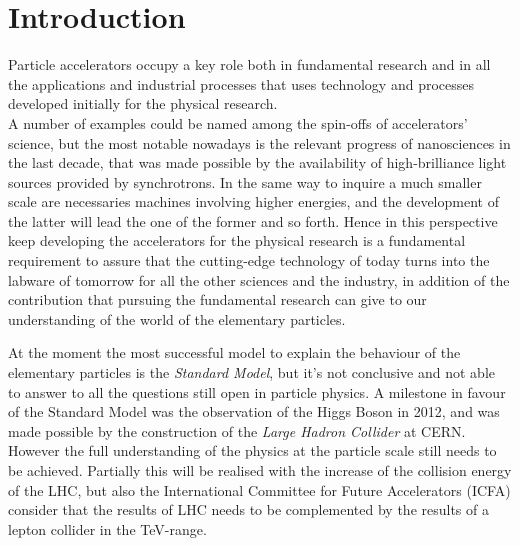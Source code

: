 \chapter{Introduction}
Particle accelerators occupy a key role both in fundamental research and in all the applications and industrial processes that uses technology and processes developed initially for the physical research.\\
A number of examples could be named among the spin-offs of accelerators' science, but the most notable nowadays is the relevant progress of nanosciences in the last decade, that was made possible by the availability of high-brilliance light sources provided by synchrotrons. In the same way to inquire a much smaller scale are necessaries machines involving higher energies, and the development of the latter will lead the one of the former and so forth.
 Hence in this perspective keep developing the accelerators for the physical research is a fundamental requirement to assure that the cutting-edge technology of today turns into the labware of tomorrow for all the other sciences and the industry, in addition of the contribution that pursuing the fundamental research can give to our understanding of the world of the elementary particles.


At the moment the most successful model to explain the behaviour of the elementary particles is the \textit{Standard Model}, but it's not conclusive and not able to answer to all the questions still open in particle physics. A milestone in favour of the Standard Model was the observation of the Higgs Boson in 2012, and was made possible by the construction of the \textit{Large Hadron Collider} at CERN\cite{CMS:higgs,ATLAS:higgs,LHC:design}. However the full understanding of the physics at the particle scale still needs to be achieved. Partially this will be realised with the increase of the collision energy of the LHC, but also the International Committee for Future Accelerators (ICFA) consider that the results of LHC needs to be complemented by the results of a lepton collider in the TeV-range\cite{ICFA:linStat}.

